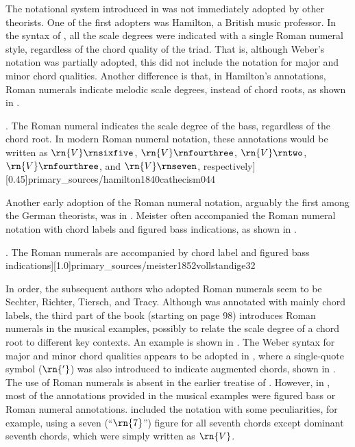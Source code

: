 
The notational system introduced in
\textcite{weber1818versuch} was not immediately adopted by
other theorists. One of the first adopters was Hamilton, a
British music professor. In the syntax of
\textcite{hamilton1840catechism}, all the scale degrees were
indicated with a single Roman numeral style, regardless of
the chord quality of the triad. That is, although Weber's
notation was partially adopted, this did not include the
notation for major and minor chord qualities. Another
difference is that, in Hamilton's annotations, Roman
numerals indicate melodic scale degrees, instead of chord
roots, as shown in
.

\phdfigure[Use of Roman numerals in \textcite[p.
44]{hamilton1840catechism}. The Roman numeral indicates the
scale degree of the bass, regardless of the chord root. In
modern Roman numeral notation, these annotations would be
written as $\rn{V}\rnsixfive$, $\rn{V}\rnfourthree$,
$\rn{V}\rntwo$, $\rn{V}\rnfourthree$, and $\rn{V}\rnseven$,
respectively][0.45]{primary_sources/hamilton1840cathecism044}

Another early adoption of the Roman numeral notation,
arguably the first among the German theorists, was in
\textcite{meister1852vollstandige}. Meister often
accompanied the Roman numeral notation with chord labels and
figured bass indications, as shown in
.

\phdfigure[Use of Roman numerals in \textcite[p.
32]{meister1852vollstandige}. The Roman numerals are
accompanied by chord label and figured bass
indications][1.0]{primary_sources/meister1852vollstandige32}

In order, the subsequent authors who adopted Roman numerals
seem to be Sechter, Richter, Tiersch, and Tracy. Although
\textcite{sechter1853grundsatze} was annotated with mainly
chord labels, the third part of the book (starting on page
98) introduces Roman numerals in the musical examples,
possibly to relate the scale degree of a chord root to
different key contexts. An example is shown in
. The Weber
syntax for major and minor chord qualities appears to be
adopted in \textcite{richter1860lehrbuch}, where a
single-quote symbol ($\rn{'}$) was also introduced to
indicate augmented chords, shown in
. The use of
Roman numerals is absent in the earlier treatise of
\textcite{tiersch1868system}. However,  in
\textcite{tiersch1874elementarbuch}, most of the annotations
provided in the musical examples were figured bass or Roman
numeral annotations. \textcite{tracy1878theory} included the
notation with some peculiarities, for example, using a seven
(``$\rn{7}$'') figure for all seventh chords except dominant
seventh chords, which were simply written as $\rn{V}$.

